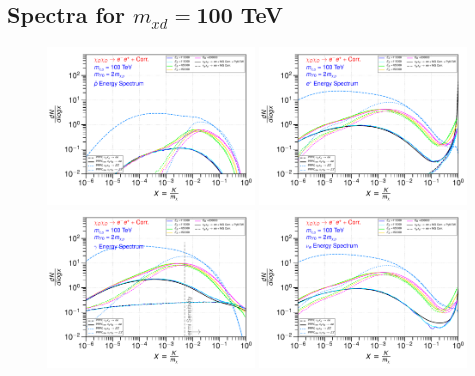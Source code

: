 \documentclass[epj,nopacs,fleqn]{svjour}
\begin{document}
\subsection{Spectra for $m_{xd}=$100 TeV}
\begin{figure}[!h]
	\centering
	\subfigure
	{ \includegraphics[width=0.49\textwidth]{Fig/xdxd_ee_eeZ_eveW/100_antiprotons_ee_eeZ_eveW_100.pdf}}
	\subfigure
	{ \includegraphics[width=0.49\textwidth]{Fig/xdxd_ee_eeZ_eveW/100_positrons_ee_eeZ_eveW_100.pdf}}
	\subfigure
	{ \includegraphics[width=0.49\textwidth]{Fig/xdxd_ee_eeZ_eveW/100_gammas_ee_eeZ_eveW_100.pdf}}
	\subfigure
	{ \includegraphics[width=0.49\textwidth]{Fig/xdxd_ee_eeZ_eveW/100_neutrinos_e_ee_eeZ_eveW_100.pdf}}

\end{figure}
\end{document}
